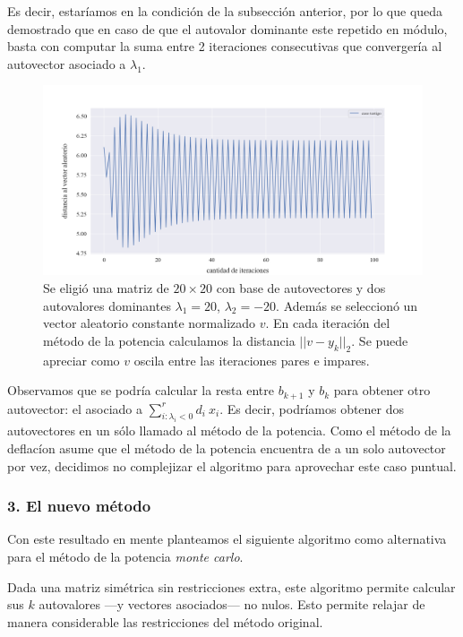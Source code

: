 Es decir, estaríamos en la condición de la subsección anterior, por lo que  queda demostrado que en caso de que el autovalor dominante este repetido en módulo, basta con computar la suma entre 2 iteraciones consecutivas que convergería al autovector asociado a $\lambda_1$.

\begin{figure}[!htbp]
    \includegraphics[scale=0.45]{files/src/.media/op_oscilante.png}
    \caption{Se eligió una matriz de $20 \times 20$ con base de autovectores y dos autovalores dominantes $\lambda_1 = 20$, $\lambda_2 = -20$. Además se seleccionó un vector aleatorio constante normalizado $v$. En cada iteración del método de la potencia calculamos la distancia $||v - y_k||_2$. Se puede apreciar como $v$ oscila entre las iteraciones pares e impares.}
    \label{fig:oscilante}
\end{figure}

\vspace{1em}
Observamos que se podría calcular la resta entre $b_{k+1}$ y $b_k$ para obtener otro autovector: el asociado a $\sum_{i: \lambda_i < 0}^{r} d_i\ x_i$. Es decir, podríamos obtener dos autovectores en un sólo llamado al método de la potencia. Como el método de la deflacíon asume que el método de la potencia encuentra de a un solo autovector por vez, decidimos no complejizar el algoritmo para aprovechar este caso puntual.



\newpage

\vspace{2em}
\subsubsection*{3. El nuevo método} Con este resultado en mente planteamos el siguiente algoritmo como alternativa para el método de la potencia \textit{monte carlo}.

\vspace{1em}


\vspace{1em}
Dada una matriz simétrica sin restricciones extra, este algoritmo permite calcular sus $k$ autovalores ---y vectores asociados--- no nulos. Esto permite relajar de manera considerable las restricciones del método original.
